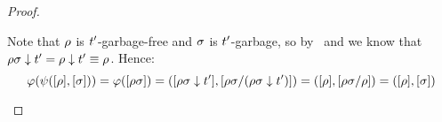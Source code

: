 \begin{proof}
\begin{enumerate}
  Note that
  $\rho$ is $t'$-garbage-free
  and $\sigma$ is $t'$-garbage,
  so by~
  and 
  we know that $\rho\sigma \downarrow t' = \rho \downarrow t' \equiv \rho$.
  Hence:
  \[
    \varphi(\psi({[\rho]},{[\sigma]}))
    = \varphi({[\rho\sigma]})
    = ({[\rho\sigma \downarrow t']}, {[\rho\sigma/(\rho\sigma \downarrow t')]})
    = ({[\rho]}, {[\rho\sigma/\rho]})
    = ({[\rho]}, {[\sigma]})
  \]
\end{enumerate}
\end{proof}

